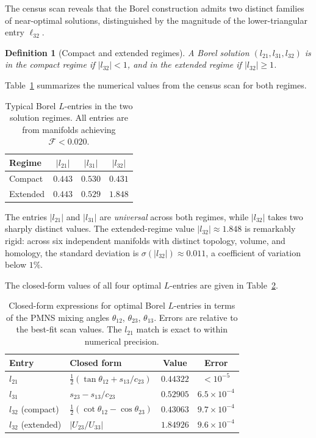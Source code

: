 \documentclass[11pt,a4paper]{article}
\newtheorem{definition}{Definition}
\begin{document}
The census scan reveals that the Borel construction admits two
distinct families of near-optimal solutions, distinguished by the
magnitude of the lower-triangular entry $\ell_{32}$.
 
\begin{definition}[Compact and extended regimes]
\label{def:regimes}
A Borel solution $(l_{21}, l_{31}, l_{32})$ is in the
\emph{compact regime} if $|l_{32}| < 1$, and in the
\emph{extended regime} if $|l_{32}| \geq 1$.
\end{definition}
 
Table~\ref{tab:regimes} summarizes the numerical values from the
census scan for both regimes.
 
\begin{table}[h]
\centering
\caption{Typical Borel $L$-entries in the two solution regimes.
All entries are from manifolds achieving $\mathcal{F} < 0.020$.}
\label{tab:regimes}
\begin{tabular}{lccc}
\toprule
Regime & $|l_{21}|$ & $|l_{31}|$ & $|l_{32}|$ \\
\midrule
Compact  & $0.443$ & $0.530$ & $0.431$ \\
Extended & $0.443$ & $0.529$ & $1.848$ \\
\bottomrule
\end{tabular}
\end{table}
 
The entries $|l_{21}|$ and $|l_{31}|$ are \emph{universal} across
both regimes, while $|l_{32}|$ takes two sharply distinct values.
The extended-regime value $|l_{32}| \approx 1.848$ is remarkably
rigid: across six independent manifolds with distinct topology,
volume, and homology, the standard deviation is $\sigma(|l_{32}|)
\approx 0.011$, a coefficient of variation below $1\%$.
 
The closed-form values of all four optimal $L$-entries are
given in Table~\ref{tab:closed_form}.
 
\begin{table}[h]
\centering
\caption{Closed-form expressions for optimal Borel $L$-entries
in terms of the PMNS mixing angles
$\theta_{12}$, $\theta_{23}$, $\theta_{13}$.
Errors are relative to the best-fit scan values.
The $l_{21}$ match is exact to within numerical precision.}
\label{tab:closed_form}
\begin{tabular}{llcc}
\toprule
Entry & Closed form & Value & Error \\
\midrule
$l_{21}$          & $\tfrac{1}{2}(\tan\theta_{12} + s_{13}/c_{23})$
                  & $0.44322$ & $<10^{-5}$ \\
$l_{31}$          & $s_{23} - s_{13}/c_{23}$
                  & $0.52905$ & $6.5\times10^{-4}$ \\
$l_{32}$ (compact)  & $\tfrac{1}{2}(\cot\theta_{12} - \cos\theta_{23})$
                  & $0.43063$ & $9.7\times10^{-4}$ \\
$l_{32}$ (extended) & $|U_{23}/U_{33}|$
                  & $1.84926$ & $9.6\times10^{-4}$ \\
\bottomrule
\end{tabular}
\end{table}
 
\end{document}
